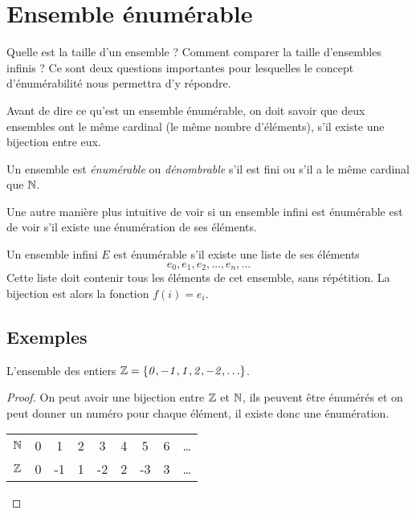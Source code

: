 \section{Ensemble énumérable}
\label{sec:ensemble_num_rables}
Quelle est la taille d'un ensemble ?  Comment comparer la taille d'ensembles infinis ? Ce sont deux questions importantes pour lesquelles le concept d'énumérabilité nous permettra d'y répondre.

Avant de dire ce qu'est un ensemble énumérable, on doit savoir que deux ensembles
ont le même cardinal (le même nombre d'éléments), s'il existe une bijection entre eux.

\begin{mydef}
	Un ensemble est \emph{énumérable} ou \emph{dénombrable} s'il est fini ou s'il a le même cardinal que $\mathbb{N}$.
\end{mydef}
Une autre manière plus intuitive de voir si un ensemble infini est énumérable est de voir s'il existe une énumération de ses éléments.

\begin{myprop}
Un ensemble infini $E$ est énumérable s'il existe une liste de ses éléments
\[
e_0, e_1, e_2, \ldots , e_n, \ldots
\]
Cette liste doit contenir tous les éléments de cet ensemble, sans répétition.  La bijection est alors la fonction $f(i) = e_i$.
\end{myprop}

\subsection{Exemples}
\label{subsec:exemples}

\begin{myexem}
  L'ensemble des entiers $\mathit{\mathbb{Z}=\{0,-1,1,2,-2,\ldots\}}$.
  \begin{proof}
     On peut avoir une bijection entre $\mathbb{Z}$ et $\mathbb{N}$, ils peuvent être énumérés et on peut donner un numéro pour chaque élément, il existe donc une énumération.

  \begin{tabular}{ l | c c c c c c c r }
     $\mathbb{N}$ & 0 & 1 & 2  & 3 & 4 & 5 & 6 & \ldots \\
     $\mathbb{Z}$ & 0 & -1 & 1 & -2 & 2 & -3 & 3  & \ldots \\

    \end{tabular}
  \end{proof}
\end{myexem}

